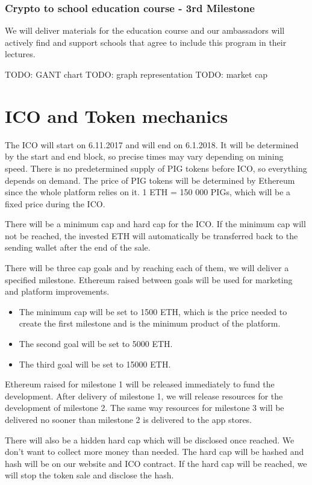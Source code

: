 \documentclass[english]{article}
\begin{document}
\subsubsection{Crypto to school education course - 3rd Milestone}
We will deliver materials for the education course and our ambassadors will actively find and support schools that agree to include this program in their lectures.

TODO: GANT chart
TODO: graph representation
TODO: market cap

\section{ICO and Token mechanics}
The ICO will start on 6.11.2017 and will end on 6.1.2018. It will be determined by the start and end block, so precise times may vary depending on mining speed. There is no predetermined supply of PIG tokens before ICO, so everything depends on demand. The price of PIG tokens will be determined by Ethereum since the whole platform relies on it. 1 ETH = 150 000 PIGs, which will be a fixed price during the ICO.

There will be a minimum cap and hard cap for the ICO. If the minimum cap will not be reached, the invested ETH will automatically be transferred back to the sending wallet after the end of the sale. 

There will be three cap goals and by reaching each of them, we will deliver a specified milestone. Ethereum raised between goals will be used for marketing and platform improvements.

\begin{itemize}
  \item The minimum cap will be set to 1500 ETH, which is the price needed to create the first milestone and is the minimum product of the platform. 
  \item The second goal will be set to 5000 ETH.
   \item The third goal will be set to 15000 ETH.
\end{itemize}

Ethereum raised for milestone 1 will be released immediately to fund the development. After delivery of milestone 1, we will release resources for the development of milestone 2. The same way resources for milestone 3 will be delivered no sooner than milestone 2 is delivered to the app stores.

There will also be a hidden hard cap which will be disclosed once reached. We don't want to collect more money than needed. The hard cap will be hashed and hash will be on our website and ICO contract. If the hard cap will be reached, we will stop the token sale and disclose the hash. 
\end{document}

